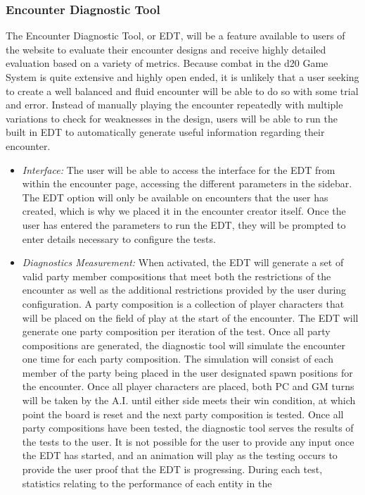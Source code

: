 \documentclass[letterpaper, 10 pt, conference]{ieeeconf}
\begin{document}
\subsubsection{Encounter Diagnostic Tool}
The Encounter Diagnostic Tool, or EDT, will be a feature available to
users of the website to evaluate their encounter designs and receive highly detailed
evaluation based on a variety of metrics. Because combat in the d20 Game System
is quite extensive and highly open ended, it is unlikely that a user seeking to
create a well balanced and fluid encounter will be able to do so with some trial
and error. Instead of manually playing the encounter repeatedly with multiple
variations to check for weaknesses in the design, users will be able to run the
built in EDT to automatically generate useful information
regarding their encounter.
\begin{itemize}
	\item \textit{Interface:} The user will be able to access the interface for the EDT
	from within the encounter page, accessing the different parameters in the sidebar.
	The EDT option will only be available on encounters that
	the user has created, which is why we placed it in the encounter creator itself.
	Once the user has entered the parameters to run the EDT, they
	will be prompted to enter details necessary to configure the tests. \\
	\item \textit{Diagnostics Measurement:} When activated, the EDT will generate a set of valid party
	member compositions that meet both the restrictions of the encounter as well as
	the additional restrictions provided by the user during configuration. A party
	composition is a collection of player characters that will be placed on the field of
	play at the start of the encounter. The EDT will generate one party
	composition per iteration of the test. Once all party compositions are generated,
	the diagnostic tool will simulate the encounter one time for each party composition.
	The simulation will consist of each member of the party being placed in the
	user designated spawn positions for the encounter. Once all player characters
	are placed, both PC and GM turns will be taken by the A.I. until either side
	meets their win condition, at which point the board is reset and the next party
	composition is tested. Once all party compositions have been tested, the diagnostic
	tool serves the results of the tests to the user. It is not possible for the user to provide any input once the EDT has started, and an animation will play as the testing occurs to provide the user proof that the EDT is progressing. During each test, statistics relating to the performance of each entity in the

\end{itemize}
\end{document}
